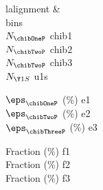 \begin{tabular}{l{}}\toprule
&  \\
{{bins}} \\
\midrule
$N_{\chibOneP}$ {{chib1}} \\
$N_{\chibTwoP}$ {{chib2}} \\
$N_{\chibTwoP}$ {{chib3}} \\
$N_{\Y1S}$ {{u1s}} \\
\rule{0pt}{4ex}$\eps_{\chibOneP}$ (\%) {{e1}} \\
$\eps_{\chibTwoP}$ (\%) {{e2}} \\
$\eps_{\chibThreeP}$ (\%) {{e3}} \\
\rule{0pt}{4ex}Fraction \chibOneP (\%) {{f1}} \\
Fraction \chibTwoP (\%) {{f2}} \\
Fraction \chibThreeP (\%) {{f3}} \\
\bottomrule
\end{tabular}